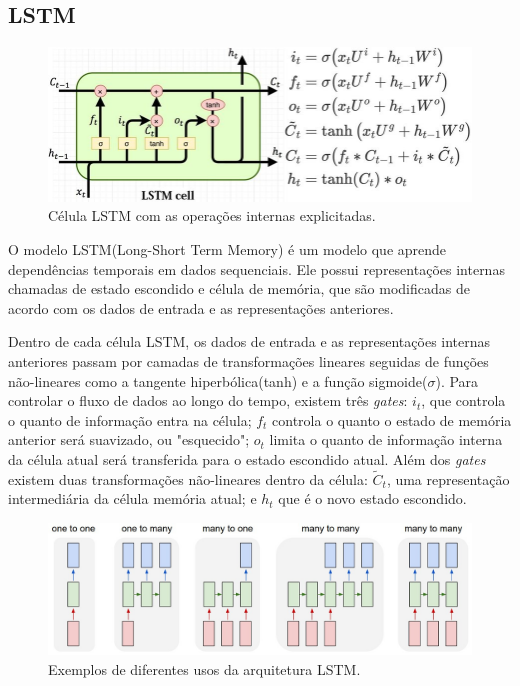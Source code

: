 \documentclass[11pt]{scrartcl} %
\begin{document}
\subsection{LSTM}

\begin{figure}[H] %
	\centering
	\includegraphics[width=0.7\columnwidth]{./Figures/lstm_and_equations.jpg} %
	\caption{Célula LSTM com as operações internas explicitadas.}
\end{figure}

O modelo LSTM(Long-Short Term Memory) é um modelo que aprende dependências temporais em dados sequenciais. Ele possui representações internas chamadas de estado escondido e célula de memória, que são modificadas de acordo com os dados de entrada e as representações anteriores.

Dentro de cada célula LSTM, os dados de entrada e as representações internas anteriores passam por camadas de transformações lineares seguidas de funções não-lineares como a tangente hiperbólica(tanh) e a função sigmoide($\sigma$). Para controlar o fluxo de dados ao longo do tempo, existem três \textit{gates}: $i_{t}$, que controla o quanto de informação entra na célula; $f_{t}$ controla o quanto o estado de memória anterior será suavizado, ou "esquecido"; $o_{t}$ limita o quanto de informação interna da célula atual será transferida para o estado escondido atual. Além dos \textit{gates} existem duas transformações não-lineares dentro da célula: $\tilde{C}_{t}$, uma representação intermediária da célula memória atual; e $h_{t}$ que é o novo estado escondido.

\begin{figure}[H] %
	\centering
	\includegraphics[width=0.8\columnwidth]{./Figures/lstm_usages.jpeg} %
	\caption{Exemplos de diferentes usos da arquitetura LSTM.}
	\label{fig:lstmConfigs}
\end{figure}
\end{document}
